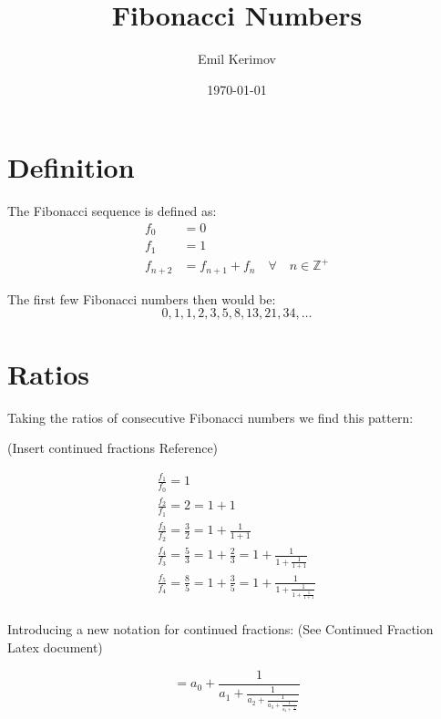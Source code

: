 \documentclass[a4paper]{article}
\title{Fibonacci Numbers}
\author{Emil Kerimov}
\date{\today}
\begin{document}
\maketitle

\newtheorem{theorem}{Theorem}[section]
\newtheorem{corollary}{Corollary}[theorem]
\newtheorem{lemma}[theorem]{Lemma}
\newtheorem{definition}{Definition}[section]

\section{Definition}\label{sec:definition}

The Fibonacci sequence is defined as:
\begin{equation}
\begin{aligned}
f_0 &= 0 \\
f_1 &= 1 \\
f_{n+2} &= f_{n+1} + f_{n} \quad \forall \quad n \in \mathbb{Z}^+
\end{aligned}\label{eq:equation2}
\end{equation}

The first few Fibonacci numbers then would be:
\[
0,1,1,2,3,5,8,13,21, 34, \dots
\]

\section{Ratios}\label{sec:basic_ratio}

Taking the ratios of consecutive Fibonacci numbers we find this pattern:

(Insert continued fractions Reference)

\begin{gather*}
\frac{f_{1}}{f_{0}} =1 \\
\frac{f_{2}}{f_{1}} =2 = 1 + 1\\
\frac{f_{3}}{f_{2}} = \frac{3}{2} = 1 + \frac{1}{1+1}\\
\frac{f_{4}}{f_{3}} = \frac{5}{3} = 1 + \frac{2}{3}= 1 + \frac{1}{1 + \frac{1}{1 + 1}}\\
\frac{f_{5}}{f_{4}} = \frac{8}{5} = 1 + \frac{3}{5}= 1 + \frac{1}{1 + \frac{1}{1 + \frac{1}{1 + 1}}}\\
\end{gather*}

Introducing a new notation for continued fractions: (See Continued Fraction Latex document)

\begin{equation}
[a_0;a_1,a_2,a_3,a_4, ...] =  a_0 + \frac{1}{a_1 + \frac{1}{a_2 + \frac{1}{a_3 +  \frac{1}{a_4 + \frac{1}{...}}}}}\label{eq:equation}
\end{equation}
\end{document}
